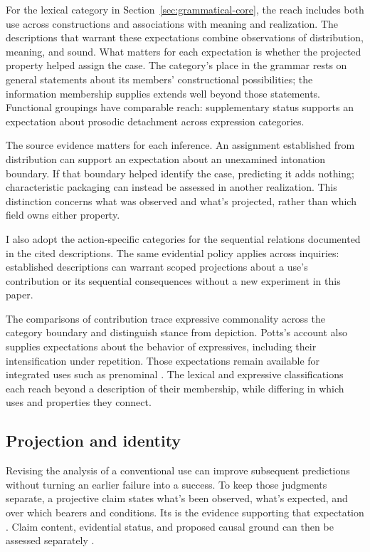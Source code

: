 \documentclass[12pt]{article}
\begin{document}
For the lexical category in Section~\ref{sec:grammatical-core}, the reach
includes both use across constructions and associations with meaning
and realization. The descriptions that warrant these expectations combine
observations of distribution, meaning, and sound. What matters for each
expectation is whether the projected property helped assign the case. The category's place in the grammar rests on general statements about
its members' constructional possibilities; the information membership
supplies extends well beyond those statements. Functional groupings have
comparable reach: supplementary status supports an expectation about
prosodic detachment across expression categories.

The source evidence matters for each inference. An assignment established
from distribution can support an expectation about an unexamined intonation
boundary. If that boundary helped identify the case, predicting it
adds nothing; characteristic packaging can instead be assessed in another
realization. This distinction concerns what was observed and what's
projected, rather than which field owns either property.

I also adopt the action-specific categories for the sequential relations
documented in the cited descriptions. The same evidential policy applies
across inquiries: established descriptions can warrant scoped projections
about a use's contribution or its sequential consequences without a new
experiment in this paper.

The comparisons of contribution trace expressive commonality across the
category boundary and distinguish stance from depiction. Potts's account also
supplies expectations about the behavior of expressives, including their
intensification under repetition. Those expectations remain available for
integrated uses such as prenominal . The lexical and
expressive classifications each reach beyond a description of their
membership, while differing in which uses and properties they connect.

\subsection{Projection and identity}

Revising the analysis of a conventional use can improve subsequent
predictions without turning an earlier failure into a success. To
keep those judgments separate, a projective claim states what's been
observed, what's expected, and over which bearers and conditions.
Its  is the evidence supporting that expectation
\citep{Goodman1955}. Claim content, evidential status, and proposed causal
ground can then be assessed separately
\citep[11--12]{reynolds2026projectibilityHistory}.
\end{document}
